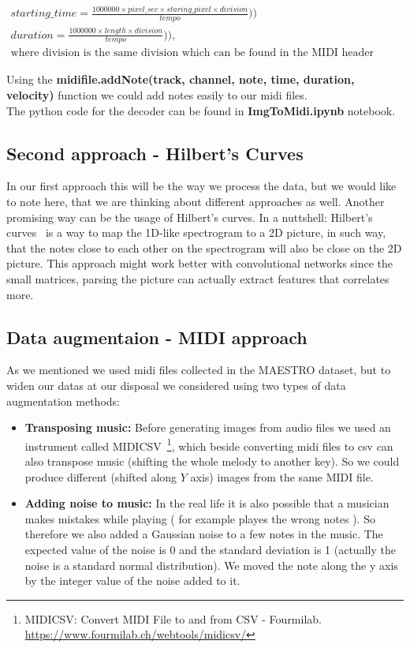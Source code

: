 \documentclass{article}
\begin{document}
		\begin{gather}
		starting\_time = \frac{1000000 \times pixel\_sec \times staring\_pixel \times division}{tempo})) \\
		duration = \frac{1000000 \times length \times division}{tempo})), \\
		\text{where division is the same division which can be found in the MIDI header message} \nonumber
		\end{gather}
	
	Using the  \textbf{midifile.addNote(track, channel, note, time, duration, velocity)} function we could add notes easily to our midi files. \\ 
	
	The python code for the decoder can be found in \textbf{ImgToMidi.ipynb} notebook.
	

\subsection{Second approach - Hilbert's Curves}

In our first approach this will be the way we process the data, but we would like to note here, that we are thinking about different approaches as well. Another promising way can be the usage of Hilbert’s curves. In a nuttshell: Hilbert’s curves~\cite{hilbert} is a way to map the 1D-like spectrogram to a 2D picture, in such way, that the notes close to each other on the spectrogram will also be close on the 2D picture. This approach might work better with convolutional networks since the small matrices, parsing the picture can actually extract features that correlates more.

\subsection{Data augmentaion - MIDI approach}

As we mentioned we used midi files collected in the MAESTRO dataset, but to widen our datas at our disposal we considered using two types of data augmentation methods: 
\begin{itemize}
	\item \textbf{Transposing music: } Before generating images from audio files we used an instrument called MIDICSV~\footnote{MIDICSV: Convert MIDI File to and from CSV - Fourmilab. \url{https://www.fourmilab.ch/webtools/midicsv/}}, which beside converting midi files to csv can also transpose music (shifting the whole melody to another key). So we could produce different (shifted along $Y$ axis) images from the same MIDI file.
	
	\item \textbf{Adding noise to music: } In the real life it is also possible that a musician makes mistakes while playing ( for example playes the wrong notes ). So therefore we also added a Gaussian noise to a few notes in the music. The expected value of the noise is 0 and the standard deviation is 1 (actually the noise is a standard normal distribution). We moved the note along the y axis by the integer value of the noise added to it.
\end{itemize}
\end{document}
